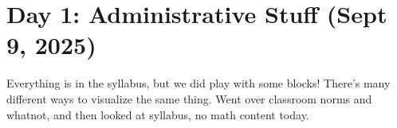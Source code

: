 \section{Day 1: Administrative Stuff (Sept 9, 2025)}

Everything is in the syllabus, but we did play with some blocks! There's many different ways to visualize the same thing. Went over classroom norms and whatnot, and then looked at syllabus, no math content today.
